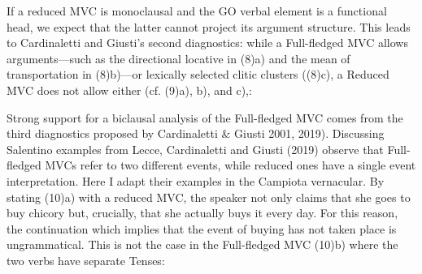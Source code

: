 \documentclass[output=paper,colorlinks,citecolor=brown,
]{langscibook}
\begin{document}
If a reduced MVC is monoclausal and the GO verbal element is a functional head, we expect that the latter cannot project its argument structure. This leads to Cardinaletti and Giusti’s second diagnostics: while a Full-fledged MVC allows arguments—such as the directional  locative in (8)a) and the mean of transportation in (8)b)—or lexically selected clitic clusters ((8)c), a Reduced MVC does not allow either (cf. (9)a), b), and c),:

\ea
    \z
\z

\ea
    \z
\z

Strong support for a biclausal analysis of the Full-fledged MVC comes from the third diagnostics proposed by Cardinaletti \& Giusti 2001, 2019). Discussing Salentino examples from Lecce, Cardinaletti and Giusti (2019) observe that Full-fledged MVCs refer to two different events, while reduced ones have a single event interpretation. Here I adapt their examples in the Campiota vernacular.  By stating (10)a) with a reduced MVC, the speaker not only claims that she goes to buy chicory but, crucially, that she actually buys it every day. For this reason, the continuation which implies that the event of buying has not taken place is ungrammatical. This is not the case in the Full-fledged MVC (10)b) where the two verbs have separate Tenses:
\end{document}
